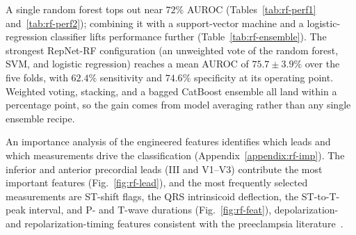 \documentclass[sigconf,nonacm]{acmart}
\begin{document}
A single random forest tops out near $72\%$ AUROC (Tables~\ref{tab:rf-perf1}
and~\ref{tab:rf-perf2}); combining it with a support-vector machine and a
logistic-regression classifier lifts performance further
(Table~\ref{tab:rf-ensemble}). The strongest RepNet-RF configuration (an
unweighted vote of the random forest, SVM, and logistic regression) reaches
a mean AUROC of $75.7\pm3.9\%$ over the five folds, with $62.4\%$ sensitivity
and $74.6\%$ specificity at its operating point. Weighted voting, stacking,
and a bagged CatBoost ensemble all land within a percentage point, so the gain
comes from model averaging rather than any single ensemble recipe.

\begin{table}[H]
\centering
\caption{RepNet-RF ensemble performance (percent, mean $\pm$ std over the five
patient-grouped folds). The best row is an unweighted vote of the random
forest with an SVM and logistic regression.}
\label{tab:rf-ensemble}
\footnotesize
\setlength{\tabcolsep}{2.7pt}
\end{table}

An importance analysis of the engineered features identifies which leads and
which measurements drive the classification (Appendix~\ref{appendix:rf-imp}).
The inferior and anterior precordial leads (III and V1--V3) contribute the
most important features (Fig.~\ref{fig:rf-lead}), and the most frequently
selected measurements are ST-shift flags, the QRS intrinsicoid deflection,
the ST-to-T-peak interval, and P- and T-wave durations
(Fig.~\ref{fig:rf-feat}), depolarization- and repolarization-timing
features consistent with the preeclampsia literature~\cite{raffaelli_pre-eclampsia_2014, angeli_novel_2015}.
\end{document}
